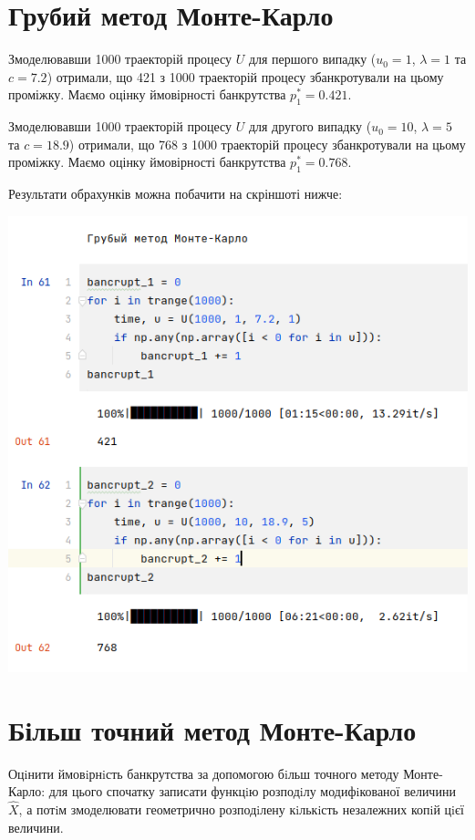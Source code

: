 \documentclass{article}
\begin{document}
    \section{Грубий метод Монте-Карло}

    Змоделювавши 1000 траекторій процесу $U$ для першого випадку ($u_0 = 1$, $\lambda = 1$ та $c = 7.2$) 
    отримали, що 421 з 1000 траекторій процесу збанкротували на цьому проміжку. Маємо оцінку ймовірності 
    банкрутства $p^*_1 =  0.421$.


    Змоделювавши 1000 траекторій процесу $U$ для другого випадку ($u_0 = 10$, $\lambda = 5$ та $c = 18.9$) 
    отримали, що 768 з 1000 траекторій процесу збанкротували на цьому проміжку. Маємо оцінку ймовірності 
    банкрутства $p^*_1 =  0.768$.


    Результати обрахунків можна побачити на скріншоті нижче:

    \includegraphics[scale=0.52]{img/2021-10-11-01-29-11.png}

    \section{Більш точний метод Монте-Карло}

    Оцiнити ймовiрнiсть банкрутства за допомогою бiльш точного методу Монте-Карло: 
    для цього спочатку записати функцiю розподiлу модифiкованої величини $\hat{X}$, 
    а потiм змоделювати геометрично розподiлену кiлькiсть незалежних копiй цiєї величини.
\end{document}
